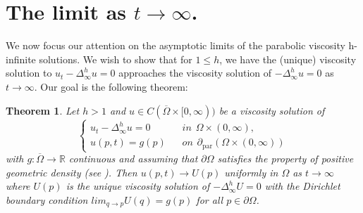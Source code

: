 \documentclass[12pt]{amsart}
\newtheorem{thm}{Theorem}[section]
\theoremstyle{definition}
\theoremstyle{remark}
\numberwithin{equation}{section}
\begin{document}
\section{ The limit as $t\to\infty$.}
We now focus our attention on the asymptotic limits of the parabolic viscosity h-infinite solutions. We wish to show that for $1 \leq h$, we have the (unique) viscosity solution to $u_t-\Delta^h_\infty u=0$ approaches the viscosity solution of $-\Delta^h_\infty u=0$ as $t\to\infty$.  Our goal is the following theorem:
\begin{thm}\label{final} Let $h>1$ and $u \in C(\overline{\Omega} \times [0,\infty))$ be a viscosity solution of 
\begin{equation}\label{finaleqn}
\left\{ \begin{array}{cl}
u_t -\Delta^h_\infty u =0 & \hspace{10pt} in \hspace{5pt} \Omega \times (0,\infty),\\ 
u(p,t) =g(p) & \hspace{10pt} on \hspace{5pt} {\partial}_{\operatorname{par}}(\Omega \times (0, \infty))
\end{array}\right.
\end{equation}
with $g:\overline{\Omega} \to \mathbb{R}$ continuous and assuming that $\partial \Omega$ satisfies the property of positive geometric density (see \cite[pg. 2909]{J:PD}).  Then $u(p,t) \to U(p)$ uniformly in $\Omega$ as $t \to \infty$ where $U(p)$ is the unique viscosity solution of $-\Delta^h_\infty U = 0$ with the Dirichlet boundary condition $lim_{q \to p} U(q) = g(p)$ for all $p \in \partial \Omega$.
\end{thm}
\end{document}
